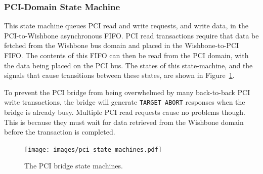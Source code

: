 \subsubsection{PCI-Domain State Machine}
This state machine queues PCI read and write requests, and write data, in the
PCI-to-Wishbone asynchronous FIFO. PCI read transactions require that data be
fetched from the Wishbone bus domain and placed in the Wishbone-to-PCI FIFO. The
contents of this FIFO can then be read from the PCI domain, with the data being
placed on the PCI bus. The states of this state-machine, and the signals that
cause transitions between these states, are shown in Figure~\ref{PCI_SMs}.

To prevent the PCI bridge from being overwhelmed by many back-to-back PCI write
transactions, the bridge will generate \texttt{TARGET ABORT} responses when the
bridge is already busy. Multiple PCI read requests cause no problems though. This
is because they must wait for data retrieved from the Wishbone domain before
the transaction is completed.

\begin{figure}[h!]
\begin{center}
\texttt{[image: images/pci\_state\_machines.pdf]}
\end{center}
\caption[The PCI bridge state machines]{The PCI bridge state machines.}
\label{PCI_SMs}
\end{figure}





